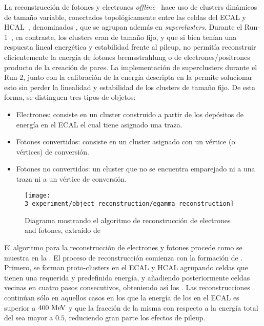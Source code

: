 La reconstrucción de fotones y electrones \textit{offline}~\cite{ATLAS-EGamma-Performance-2015-2017,ATLAS-TopoClusters-Run2} hace uso de clusters dinámicos de tamaño variable, conectados topológicamente entre las celdas del \ac{ECAL} y \ac{HCAL}~\cite{ATLAS-TopoClusters-Run1}, denominados \textit{\topos}, que se agrupan adem\'as en \textit{superclusters}. 
Durante el Run-1~\cite{ATLAS-EGamma-Performance-Run1, ATLAS-EGamma-CalibrationPerformance-Run1, ATLAS-CalorimeterClustering-2008}, en contraste, los clusters eran de tama\~no fijo, y que si bien ten\'ian una respuesta lineal energ\'etica y estabilidad frente al pileup, no permit\'ia reconstruir eficientemente la energ\'ia de fotones bremsstrahlung o de electrones/positrones producto de la creaci\'on de pares. La implementaci\'on de superclusters durante el Run-2, junto con la calibraci\'on de la energ\'ia descripta en la  permite solucionar esto sin perder la linealidad y estabilidad de los clusters de tama\~no fijo.
De esta forma, se distinguen tres tipos de objetos:
\begin{itemize}
    \item Electrones: consiste en un cluster construido a partir de los depósitos de energía en el \ac{ECAL} el cual tiene asignado una traza.
    \item Fotones convertidos: consiste en un cluster asignado con un vértice (o vértices) de conversión.
    \item Fotones no convertidos: un cluster que no se encuentra emparejado ni a una traza ni a un vértice de conversión.
\end{itemize}

\begin{figure}[ht!]
    \centering
    \texttt{[image: 3\_experiment/object\_reconstruction/egamma\_reconstruction]}
    \caption{Diagrama mostrando el algoritmo de reconstrucci\'on de electrones and fotones, extra\'ido de }
    \label{fig:objects:egamma:reco:reco_diagram}
\end{figure}

El algoritmo para la reconstrucción de electrones y fotones procede como se muestra en la \Fig{\ref{fig:objects:egamma:reco:reco_diagram}}.
El proceso de reconstrucción comienza con la formación de \topos. Primero, se forman proto-clusters en el \ac{ECAL} y \ac{HCAL} agrupando celdas que tienen una requerida y predefinida energía, y añadiendo posteriormente celdas vecinas en cuatro pasos consecutivos, obteniendo as\'i los \topos. Las reconstrucciones contin\'uan sólo en aquellos casos en los que la energía de los \topos en el \ac{ECAL} es superior a \(400~\text{MeV}\) y que la fracci\'on de la misma con respecto a la energ\'ia total del \topo sea mayor a \(0.5\), reduciendo gran parte los efectos de pileup.

